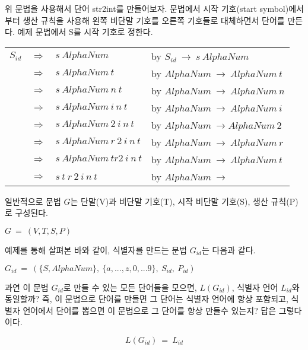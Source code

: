 \documentclass[a4paper]{book}
\begin{document}
위 문법을 사용해서 단어 str2int를 만들어보자. 문법에서 시작 기호(start
symbol)에서부터 생산 규칙을 사용해 왼쪽 비단말 기호를 오른쪽 기호들로
대체하면서 단어를 만든다. 예제 문법에서 S를 시작 기호로 정한다.

\begin{center}
  \begin{tabular}{r c l l }
    $S_{id}$
      & $\Rightarrow$ & $s \ AlphaNum$  & by $S_{id} \ \rightarrow \ s \ AlphaNum$ \\
      & $\Rightarrow$ & $s \ AlphaNum \ t$ & by $AlphaNum \ \rightarrow \ AlphaNum \ t$ \\
      & $\Rightarrow$ & $s \ AlphaNum \ n \ t$ & by $AlphaNum \ \rightarrow \ AlphaNum \ n$ \\
      & $\Rightarrow$ & $s \ AlphaNum \ i \ n \ t$ & by $AlphaNum \ \rightarrow \ AlphaNum \ i$ \\
      & $\Rightarrow$ & $s \ AlphaNum \ 2 \ i \ n \ t$ & by $AlphaNum \ \rightarrow AlphaNum \ 2$ \\
      & $\Rightarrow$ & $s \ AlphaNum \ r \ 2 \ i \ n \ t$ & by $AlphaNum \ \rightarrow \ AlphaNum \ r$ \\
      & $\Rightarrow$ & $s \ AlphaNum \ t r 2 \ i \ n \ t$ & by $AlphaNum \ \rightarrow \ AlphaNum \ t$ \\
      & $\Rightarrow$ & $s \ t \ r \ 2 \ i \ n \ t$ & by $AlphaNum \ \rightarrow \ $ 
  \end{tabular}
\end{center}

일반적으로 문법 $G$는 단말(V)과 비단말 기호(T), 시작 비단말 기호(S),
생산 규칙(P)로 구성된다.

\begin{center}
  $ G \ = \ (V, T, S, P) $
\end{center}

예제를 통해 살펴본 바와 같이, 식별자를 만드는 문법 $G_{id}$는 다음과 같다.

\begin{center}
  $ G_{id} \ = \ (\{S, AlphaNum\}, \ \{a,...,z,0,...9 \}, \ S_{id}, \ P_{id}) $
\end{center}

과연 이 문법 $G_{id}$로 만들 수 있는 모든 단어들을 모으면, $
L(G_{id})$, 식별자 언어 $L_{id}$와 동일할까?
%
즉, 이 문법으로 단어를 만들면 그 단어는 식별자 언어에 항상 포함되고,
식별자 언어에서 단어를 뽑으면 이 문법으로 그 단어를 항상 만들수
있는지? 답은 그렇다이다.

\begin{equation}
  L(G_{id}) \ = \ L_{id}
  \label{equ:gidisequaltolid}
\end{equation}
\end{document}
